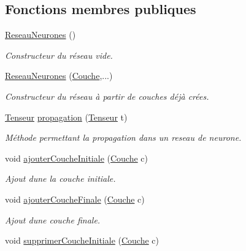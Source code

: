 \subsection*{Fonctions membres publiques}
\begin{DoxyCompactItemize}
\item 
\mbox{\label{classReseauNeurones_aaeb64d6dcc72efb8dd3a2ab46e548ffa}} 
\hyperlink{classReseauNeurones_aaeb64d6dcc72efb8dd3a2ab46e548ffa}{Reseau\+Neurones} ()
\begin{DoxyCompactList}\small\item\em Constructeur du réseau vide. \end{DoxyCompactList}\item 
\mbox{\label{classReseauNeurones_aa7c75b3511f748811e9cbd4643ae27e4}} 
\hyperlink{classReseauNeurones_aa7c75b3511f748811e9cbd4643ae27e4}{Reseau\+Neurones} (\hyperlink{classCouche}{Couche},...)
\begin{DoxyCompactList}\small\item\em Constructeur du réseau à partir de couches déjà crées. \end{DoxyCompactList}\item 
\hyperlink{classTenseur}{Tenseur} \hyperlink{classReseauNeurones_a7079f7694f0369187b8ff28cefcbc5eb}{propagation} (\hyperlink{classTenseur}{Tenseur} t)
\begin{DoxyCompactList}\small\item\em Méthode permettant la propagation dans un reseau de neurone. \end{DoxyCompactList}\item 
void \hyperlink{classReseauNeurones_a21335ab1fa9c375290cb36cb06d77c79}{ajouter\+Couche\+Initiale} (\hyperlink{classCouche}{Couche} c)
\begin{DoxyCompactList}\small\item\em Ajout d\textquotesingle{}une la couche initiale. \end{DoxyCompactList}\item 
void \hyperlink{classReseauNeurones_a8802f175e367ecd5ab3ad2d4d5b91058}{ajouter\+Couche\+Finale} (\hyperlink{classCouche}{Couche} c)
\begin{DoxyCompactList}\small\item\em Ajout d\textquotesingle{}une couche finale. \end{DoxyCompactList}\item 
void \hyperlink{classReseauNeurones_a1f8002e2367febe871dda7dc32c02784}{supprimer\+Couche\+Initiale} (\hyperlink{classCouche}{Couche} c)

\end{DoxyCompactItemize}
